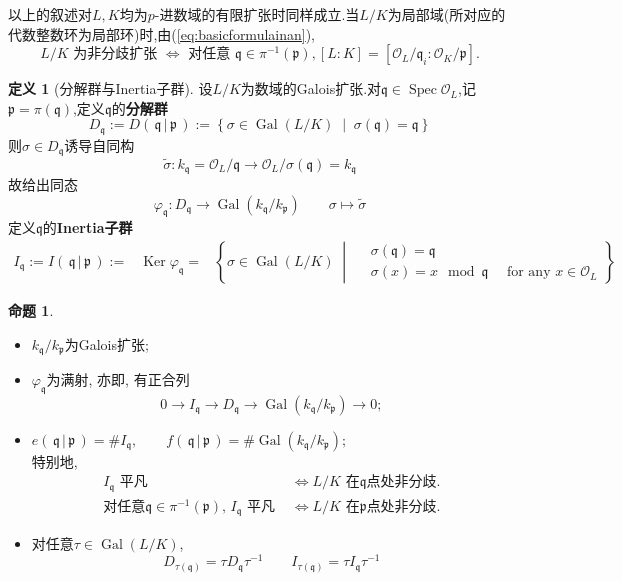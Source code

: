 \documentclass[12pt,A4paper,oneside,reqno]{amsart}
\numberwithin{equation}{section}
\theoremstyle{definition}
\newtheorem{proposition}[theorem]{命题}
\newtheorem{defn}[theorem]{定义}
\theoremstyle{plain}
\theoremstyle{plain}
\numberwithin{equation}{section}
\theoremstyle{remark}
\DeclareMathOperator{\Ker}{\operatorname{Ker}}
\newcommand{\Spec}{\operatorname{Spec}}
\newcommand{\Gal}{\operatorname{Gal}}
\begin{document}
以上的叙述对$L,K$均为$p$-进数域的有限扩张时同样成立.当$L/K$为局部域(所对应的代数整数环为局部环)时,由(\ref{eq:basicformulainan}),
$$L/K \text{ 为非分歧扩张 } \Longleftrightarrow \text{ 对任意 }\mathfrak{q} \in \pi^{-1}(\mathfrak{p}), [L:K]=[\mathcal{O}_L/\mathfrak{q}_i:\mathcal{O}_K/\mathfrak{p}].$$
\begin{defn}[分解群与Inertia子群]
	设$L/K$为数域的Galois扩张.对$\mathfrak{q} \in \Spec \mathcal{O}_L$,记$\mathfrak{p}=\pi(\mathfrak{q})$,定义$\mathfrak{q}$的\textbf{分解群}
	$$D_{\mathfrak{q}}:=D(\,\mathfrak{q}\,|\,\mathfrak{p}\,):=\left\{\sigma \in \Gal(L/K) \;\middle|\; \sigma(\mathfrak{q})=\mathfrak{q} \right\}$$
	则$\sigma \in D_{\mathfrak{q}}$诱导自同构
	$$\tilde{\sigma}: k_{\mathfrak{q}} = \mathcal{O}_L/{\mathfrak{q}} \longrightarrow \mathcal{O}_L/\sigma(\mathfrak{q})=k_{\mathfrak{q}}$$
	故给出同态
	$$\varphi_{\mathfrak{q}}:D_{\mathfrak{q}} \longrightarrow \Gal(k_{\mathfrak{q}}/k_{\mathfrak{p}}) \qquad \sigma \longmapsto \tilde{\sigma}$$
	定义$\mathfrak{q}$的\textbf{Inertia子群}
	\begin{equation*}
	\begin{aligned}
		I_{\mathfrak{q}}:=I(\,\mathfrak{q}\,|\,\mathfrak{p}\,):=& \Ker \varphi_{\mathfrak{q}}
		=&\left\{\sigma \in \Gal(L/K) \;\middle|\; \begin{aligned}
		&\sigma(\mathfrak{q})=\mathfrak{q}\\
		&\sigma(x)=x \mod \mathfrak{q} \quad\text{ for any }x \in \mathcal{O}_L
		\end{aligned} \right\}
	\end{aligned}
	\end{equation*}
\end{defn}
\begin{proposition}\label{prop:Inertia}\
	\begin{itemize}
		\item $k_{\mathfrak{q}}/k_{\mathfrak{p}}$为Galois扩张;
		\item $\varphi_{\mathfrak{q}}$为满射, 亦即, 有正合列
		$$0 \longrightarrow I_{\mathfrak{q}} \longrightarrow D_{\mathfrak{q}} \longrightarrow \Gal(k_{\mathfrak{q}}/k_{\mathfrak{p}}) \longrightarrow 0;$$
		\item $e(\,\mathfrak{q}\,|\,\mathfrak{p}\,)=\#I_{\mathfrak{q}}, \qquad f(\,\mathfrak{q}\,|\,\mathfrak{p}\,)=\# \Gal(k_{\mathfrak{q}}/k_{\mathfrak{p}});$\\
		特别地,
		\begin{equation*}
		\begin{aligned}
		I_{\mathfrak{q}}\text{ 平凡 }& \Longleftrightarrow L/K \text{ 在$\mathfrak{q}$点处非分歧.}\\
		\text{对任意$\mathfrak{q} \in \pi^{-1}(\mathfrak{p})$, } I_{\mathfrak{q}}\text{ 平凡 }& \Longleftrightarrow L/K \text{ 在$\mathfrak{p}$点处非分歧.}
		\end{aligned}
		\end{equation*}
		\item 对任意$\tau \in \Gal(L/K)$,
		$$D_{\tau(\mathfrak{q})}=\tau D_{\mathfrak{q}}\tau^{-1} \qquad I_{\tau(\mathfrak{q})}=\tau I_{\mathfrak{q}}\tau^{-1}$$
	\end{itemize}
\end{proposition}
		
\end{document}
